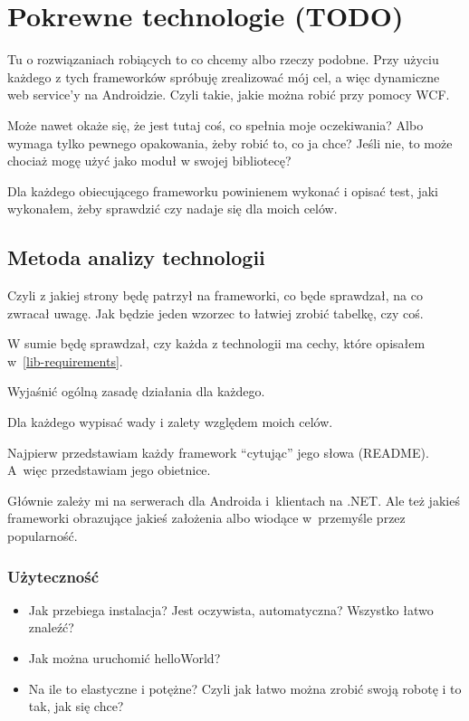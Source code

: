 \chapter{Pokrewne technologie (TODO)}
Tu o rozwiązaniach robiących to co chcemy albo rzeczy podobne. Przy użyciu każdego z tych frameworków spróbuję zrealizować mój cel, a więc dynamiczne web service'y na Androidzie. Czyli takie, jakie można robić przy pomocy WCF.

Może nawet okaże się, że jest tutaj coś, co spełnia moje oczekiwania? Albo wymaga tylko pewnego opakowania, żeby robić to, co ja chce?
Jeśli nie, to może chociaż mogę użyć jako moduł w swojej bibliotecę?

Dla każdego obiecującego frameworku powinienem wykonać i opisać test, jaki wykonałem, żeby sprawdzić czy nadaje się dla moich celów.

\section{Metoda analizy technologii}
Czyli z jakiej strony będę patrzył na frameworki, co będe sprawdzał, na co zwracał uwagę. Jak będzie jeden wzorzec to łatwiej zrobić tabelkę, czy coś.

W sumie będę sprawdzał, czy każda z technologii ma cechy, które opisałem w~\ref{lib-requirements}.

Wyjaśnić ogólną zasadę działania dla każdego.

Dla każdego wypisać wady i zalety względem moich celów.

Najpierw przedstawiam każdy framework ``cytując'' jego słowa (README). A~więc przedstawiam jego obietnice.

Głównie zależy mi na serwerach dla Androida i~klientach na .NET\@. Ale też jakieś frameworki obrazujące jakieś założenia albo wiodące w~przemyśle przez popularność.

\subsection{Użyteczność}
\begin{itemize}
	\item Jak przebiega instalacja? Jest oczywista, automatyczna? Wszystko łatwo znaleźć?
	\item Jak można uruchomić helloWorld?
	\item Na ile to elastyczne i potężne? Czyli jak łatwo można zrobić swoją robotę i to tak, jak się chce?
\end{itemize}

